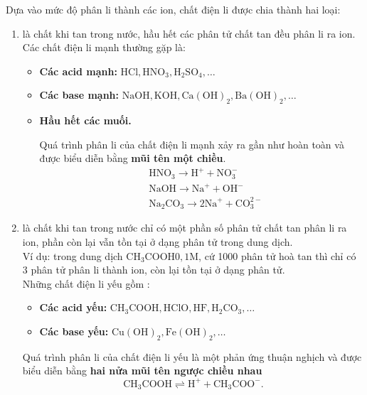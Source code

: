 \vspace*{0.25cm}
\begin{tomtat}
	Dựa vào mức độ phân li thành các ion, chất điện li được chia thành hai loại:
	\begin{enumerate}
	\item {} là chất khi tan trong nước, hầu hết các phân tử chất tan đều phân li ra ion. Các chất điện li mạnh thường gặp là:
\begin{itemize}
		\item \textbf{Các acid mạnh:} $\mathrm{HCl}, \mathrm{HNO}_3, \mathrm{H}_2 \mathrm{SO}_4, \ldots$
		\item \textbf{Các base mạnh:} $\mathrm{NaOH}, \mathrm{KOH}, \mathrm{Ca}(\mathrm{OH})_2, \mathrm{Ba}(\mathrm{OH})_2, \ldots$
		\item \textbf{Hầu hết các muối.}
		
	Quá trình phân li của chất điện li mạnh xảy ra gần như hoàn toàn và được biểu diễn bằng \textbf{mũi tên một chiều}.
	\[
	\begin{aligned}
		& \mathrm{HNO}_3 \longrightarrow \mathrm{H}^{+}+\mathrm{NO}_3^{-} \\
		& \mathrm{NaOH} \longrightarrow \mathrm{Na}^{+}+\mathrm{OH}^{-} \\
		& \mathrm{Na}_2 \mathrm{CO}_3 \longrightarrow 2 \mathrm{Na}^{+}+\mathrm{CO}_3^{2-}
	\end{aligned}
	\]
	\end{itemize}
	\item {} là chất khi tan trong nước chỉ có một phần số phân tử chất tan phân li ra ion, phần còn lại vẫn tồn tại ở dạng phân tử trong dung dịch.
	\\
	Ví dụ: trong dung dịch $\mathrm{CH}_3 \mathrm{COOH} 0,1 \mathrm{M}$, cứ 1000 phân tử hoà tan thì chỉ có 3 phân tử phân li thành ion, còn lại tồn tại ở dạng phân tử.
	\\
	Những chất điện li yếu gồm :
	\begin{itemize}
		\item \textbf{Các acid yếu:} $\mathrm{CH}_3 \mathrm{COOH}, \mathrm{HClO}, \mathrm{HF}, \mathrm{H}_2 \mathrm{CO}_3, \ldots$  
		\item \textbf{Các base yếu:} $\mathrm{Cu}(\mathrm{OH})_2, \mathrm{Fe}(\mathrm{OH})_2, \ldots$
	\end{itemize}
	Quá trình phân li của chất điện li yếu là một phản ứng thuận nghịch và được biểu diễn bằng \textbf{hai nửa mũi tên ngược chiều nhau}
	$$
	\mathrm{CH}_3 \mathrm{COOH} \rightleftharpoons \mathrm{H}^{+}+\mathrm{CH}_3 \mathrm{COO}^{-} .
	$$
	\end{enumerate}
\end{tomtat}
